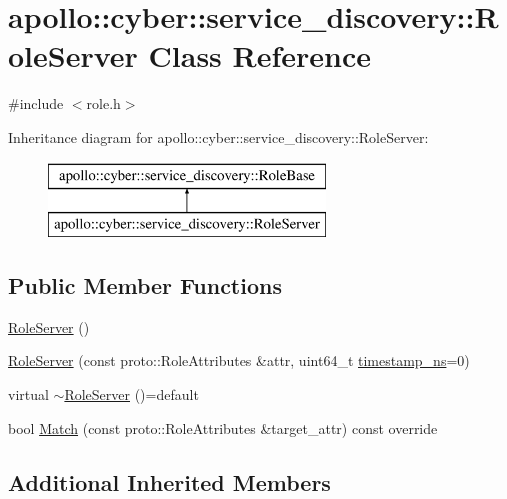 \hypertarget{classapollo_1_1cyber_1_1service__discovery_1_1RoleServer}{\section{apollo\-:\-:cyber\-:\-:service\-\_\-discovery\-:\-:Role\-Server Class Reference}
\label{classapollo_1_1cyber_1_1service__discovery_1_1RoleServer}
}


{\ttfamily \#include $<$role.\-h$>$}

Inheritance diagram for apollo\-:\-:cyber\-:\-:service\-\_\-discovery\-:\-:Role\-Server\-:\begin{figure}[H]
\begin{center}
\leavevmode
\includegraphics[height=2.000000cm]{classapollo_1_1cyber_1_1service__discovery_1_1RoleServer}
\end{center}
\end{figure}
\subsection*{Public Member Functions}
\begin{DoxyCompactItemize}
\item 
\hyperlink{classapollo_1_1cyber_1_1service__discovery_1_1RoleServer_a39e7881cb65c2befcbe2e07d431e7cf6}{Role\-Server} ()
\item 
\hyperlink{classapollo_1_1cyber_1_1service__discovery_1_1RoleServer_ab617a24618f9198372d09df5d8023803}{Role\-Server} (const proto\-::\-Role\-Attributes \&attr, uint64\-\_\-t \hyperlink{classapollo_1_1cyber_1_1service__discovery_1_1RoleBase_afada3e0a6c73eefed35c47088e3540c1}{timestamp\-\_\-ns}=0)
\item 
virtual \hyperlink{classapollo_1_1cyber_1_1service__discovery_1_1RoleServer_a3a74e9a735c884c011cb8dfbf3531fbb}{$\sim$\-Role\-Server} ()=default
\item 
bool \hyperlink{classapollo_1_1cyber_1_1service__discovery_1_1RoleServer_a1933ec9a82345518053070c263f5f048}{Match} (const proto\-::\-Role\-Attributes \&target\-\_\-attr) const override
\end{DoxyCompactItemize}
\subsection*{Additional Inherited Members}


